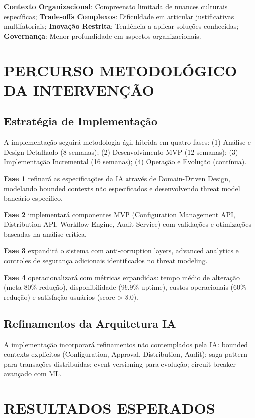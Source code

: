 \textbf{Contexto Organizacional}: Compreensão limitada de nuances culturais específicas; \textbf{Trade-offs Complexos}: Dificuldade em articular justificativas multifatoriais; \textbf{Inovação Restrita}: Tendência a aplicar soluções conhecidas; \textbf{Governança}: Menor profundidade em aspectos organizacionais.

\chapter{PERCURSO METODOLÓGICO DA INTERVENÇÃO}

\section{Estratégia de Implementação}

A implementação seguirá metodologia ágil híbrida em quatro fases: (1) Análise e Design Detalhado (8 semanas); (2) Desenvolvimento MVP (12 semanas); (3) Implementação Incremental (16 semanas); (4) Operação e Evolução (contínua).

\textbf{Fase 1} refinará as especificações da IA através de Domain-Driven Design, modelando bounded contexts não especificados e desenvolvendo threat model bancário específico.

\textbf{Fase 2} implementará componentes MVP (Configuration Management API, Distribution API, Workflow Engine, Audit Service) com validações e otimizações baseadas na análise crítica.

\textbf{Fase 3} expandirá o sistema com anti-corruption layers, advanced analytics e controles de segurança adicionais identificados no threat modeling.

\textbf{Fase 4} operacionalizará com métricas expandidas: tempo médio de alteração (meta 80\% redução), disponibilidade (99.9\% uptime), custos operacionais (60\% redução) e satisfação usuários (score > 8.0).

\section{Refinamentos da Arquitetura IA}

A implementação incorporará refinamentos não contemplados pela IA: bounded contexts explícitos (Configuration, Approval, Distribution, Audit); saga pattern para transações distribuídas; event versioning para evolução; circuit breaker avançado com ML.

\chapter{RESULTADOS ESPERADOS}

